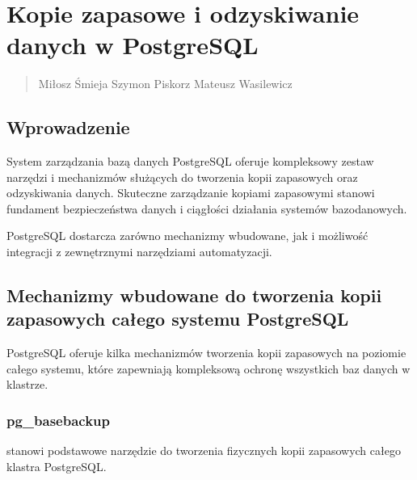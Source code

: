 \documentclass[a4paper,11pt,polish]{sphinxmanual}
\begin{document}
\chapter{Kopie zapasowe i odzyskiwanie danych w PostgreSQL}
\label{\detokenize{Kopie_zapasowe_i_odzyskiwanie_danych/kopie_zapasowe_i_odzyskiwanie_danych:kopie-zapasowe-i-odzyskiwanie-danych-w-postgresql}}\label{\detokenize{Kopie_zapasowe_i_odzyskiwanie_danych/kopie_zapasowe_i_odzyskiwanie_danych::doc}}\begin{quote}\begin{description}
\sphinxAtStartPar
Miłosz Śmieja Szymon Piskorz Mateusz Wasilewicz

\end{description}\end{quote}


\section{Wprowadzenie}
\label{\detokenize{Kopie_zapasowe_i_odzyskiwanie_danych/kopie_zapasowe_i_odzyskiwanie_danych:wprowadzenie}}
\sphinxAtStartPar
System zarządzania bazą danych PostgreSQL oferuje kompleksowy zestaw narzędzi i mechanizmów służących do tworzenia kopii zapasowych oraz odzyskiwania danych. Skuteczne zarządzanie kopiami zapasowymi stanowi fundament bezpieczeństwa danych i ciągłości działania systemów bazodanowych.

\sphinxAtStartPar
PostgreSQL dostarcza zarówno mechanizmy wbudowane, jak i możliwość integracji z zewnętrznymi narzędziami automatyzacji.


\section{Mechanizmy wbudowane do tworzenia kopii zapasowych całego systemu PostgreSQL}
\label{\detokenize{Kopie_zapasowe_i_odzyskiwanie_danych/kopie_zapasowe_i_odzyskiwanie_danych:mechanizmy-wbudowane-do-tworzenia-kopii-zapasowych-calego-systemu-postgresql}}
\sphinxAtStartPar
PostgreSQL oferuje kilka mechanizmów tworzenia kopii zapasowych na poziomie całego systemu, które zapewniają kompleksową ochronę wszystkich baz danych w klastrze.


\subsection{pg\_basebackup}
\label{\detokenize{Kopie_zapasowe_i_odzyskiwanie_danych/kopie_zapasowe_i_odzyskiwanie_danych:pg-basebackup}}
\sphinxAtStartPar
{} stanowi podstawowe narzędzie do tworzenia fizycznych kopii zapasowych całego klastra PostgreSQL.
\end{document}
